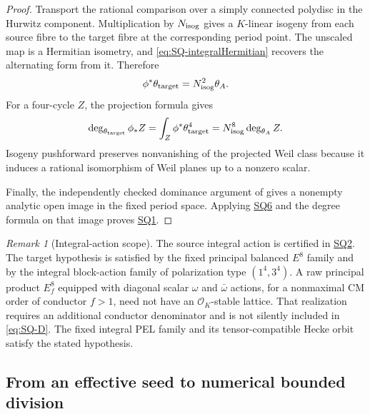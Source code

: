 \documentclass[11pt,a4paper]{article}
\theoremstyle{definition}\newtheorem{definition}[theorem]{Definition}
\theoremstyle{remark}\newtheorem{remark}[theorem]{Remark}
\newcommand{\cO}{\mathcal O}\newcommand{\CH}{\operatorname{CH}}\newcommand{\cl}{\operatorname{cl}}
\newcommand{\findingref}[1]{\hyperref[#1]{\textsf{#1}}}
\begin{document}
\begin{proof}
Transport the rational comparison over a simply connected polydisc in the Hurwitz component. Multiplication by $N_{\rm isog}$ gives a $K$-linear isogeny from each source fibre to the target fibre at the corresponding period point. The unscaled map is a Hermitian isometry, and \eqref{eq:SQ-integralHermitian} recovers the alternating form from it. Therefore
\[
 \phi^*\theta_{\rm target}=N_{\rm isog}^{2}\theta_A.
\]
For a four-cycle $Z$, the projection formula gives
\[
 \deg_{\theta_{\rm target}}\phi_*Z
 =\int_Z\phi^*\theta_{\rm target}^4
 =N_{\rm isog}^{8}\deg_{\theta_A}Z.
\]
Isogeny pushforward preserves nonvanishing of the projected Weil class because it induces a rational isomorphism of Weil planes up to a nonzero scalar.

Finally, the independently checked dominance argument of \citet[Section~9, proof of Theorem~A]{Severn26} gives a nonempty analytic open image in the fixed period space. Applying \findingref{SQ6} and the degree formula on that image proves \findingref{SQ1}.
\end{proof}

\begin{remark}[Integral-action scope]
The source integral action is certified in \findingref{SQ2}. The target hypothesis is satisfied by the fixed principal balanced $E^8$ family and by the integral block-action family of polarization type $(1^4,3^4)$. A raw principal product $E_f^8$ equipped with diagonal scalar $\omega$ and $\bar\omega$ actions, for a nonmaximal CM order of conductor $f>1$, need not have an $\cO_K$-stable lattice. That realization requires an additional conductor denominator and is not silently included in \eqref{eq:SQ-D}. The fixed integral PEL family and its tensor-compatible Hecke orbit satisfy the stated hypothesis.
\end{remark}

\subsection{From an effective seed to numerical bounded division}
\end{document}
